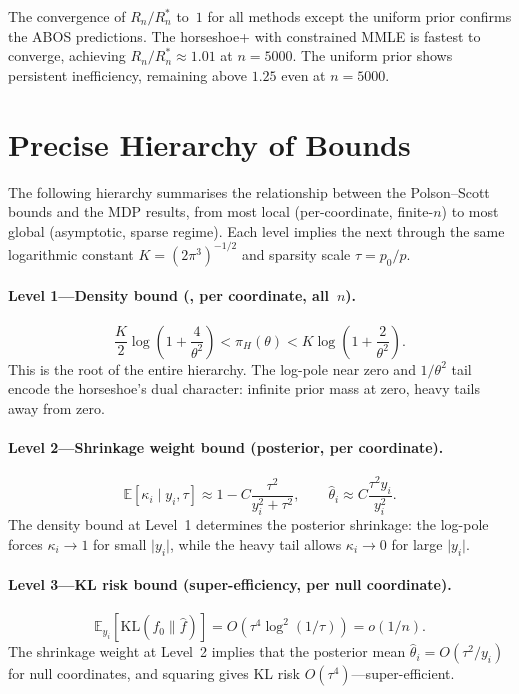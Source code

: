 \documentclass[12pt]{article}
\newcommand{\E}{\mathbb{E}}
\newcommand{\KL}{\mathrm{KL}}
\newcommand{\abs}[1]{\lvert #1 \rvert}
\newcommand{\piH}{\pi_H}
\begin{document}
The convergence of $R_n/R_n^*$ to~$1$ for all methods except the uniform prior confirms the ABOS predictions. The horseshoe+ with constrained MMLE is fastest to converge, achieving $R_n/R_n^* \approx 1.01$ at $n = 5000$. The uniform prior shows persistent inefficiency, remaining above $1.25$ even at $n = 5000$.


\section{Precise Hierarchy of Bounds}\label{sec:hierarchy}

The following hierarchy summarises the relationship between the Polson--Scott bounds and the MDP results, from most local (per-coordinate, finite-$n$) to most global (asymptotic, sparse regime). Each level implies the next through the same logarithmic constant $K = (2\pi^3)^{-1/2}$ and sparsity scale $\tau = p_0/p$.

\paragraph{Level 1---Density bound (, per coordinate, all~$n$).}
\[
  \frac{K}{2}\log\!\left(1+\frac{4}{\theta^2}\right)
  < \piH(\theta)
  < K\log\!\left(1+\frac{2}{\theta^2}\right).
\]
This is the root of the entire hierarchy. The log-pole near zero and $1/\theta^2$ tail encode the horseshoe's dual character: infinite prior mass at zero, heavy tails away from zero.

\paragraph{Level 2---Shrinkage weight bound (posterior, per coordinate).}
\[
  \E[\kappa_i \mid y_i, \tau]
  \approx 1 - C\frac{\tau^2}{y_i^2 + \tau^2}, \qquad
  \hat\theta_i \approx C\frac{\tau^2 y_i}{y_i^2}.
\]
The density bound at Level~1 determines the posterior shrinkage: the log-pole forces $\kappa_i \to 1$ for small $\abs{y_i}$, while the heavy tail allows $\kappa_i \to 0$ for large $\abs{y_i}$.

\paragraph{Level 3---KL risk bound (super-efficiency, per null coordinate).}
\[
  \E_{y_i}\!\left[\KL(f_0 \| \hat{f})\right]
  = O(\tau^4\log^2(1/\tau))
  = o(1/n).
\]
The shrinkage weight at Level~2 implies that the posterior mean $\hat{\theta}_i = O(\tau^2/y_i)$ for null coordinates, and squaring gives KL risk $O(\tau^4)$---super-efficient.
\end{document}
